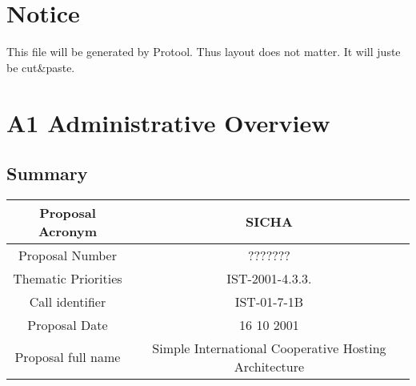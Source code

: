 \documentclass[a4paper,11pt]{report}
\begin{document}
\section*{Notice}
This file will be generated by Protool. Thus layout does not matter. It will
juste be cut\&paste.
\section*{A1 Administrative Overview}
\subsection*{Summary}
\begin{tabular}{|c|c|}
\hline
Proposal Acronym &  SICHA \\ \hline
Proposal Number &  ??????? \\ \hline
Thematic Priorities & IST-2001-4.3.3. \\ \hline
Call identifier & IST-01-7-1B\\ \hline
Proposal Date & 16 10 2001 \\ \hline
Proposal full name & Simple International Cooperative Hosting Architecture \\ \hline
\end{tabular}
\end{document}
